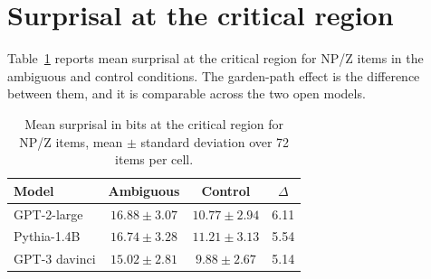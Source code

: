 \documentclass[11pt]{article}
\begin{document}
\section{Surprisal at the critical region}

Table~\ref{tab:calibration} reports mean surprisal at the critical region for
NP/Z items in the ambiguous and control conditions. The garden-path effect is
the difference between them, and it is comparable across the two open models.

\begin{table}[t]
\centering
\begin{tabular}{lccc}
\toprule
Model & Ambiguous & Control & $\Delta$ \\
\midrule
GPT-2-large   & $16.88 \pm 3.07$ & $10.77 \pm 2.94$ & 6.11 \\
Pythia-1.4B   & $16.74 \pm 3.28$ & $11.21 \pm 3.13$ & 5.54 \\
GPT-3 davinci & $15.02 \pm 2.81$ & $9.88 \pm 2.67$  & 5.14 \\
\bottomrule
\end{tabular}
\caption{Mean surprisal in bits at the critical region for NP/Z items,
mean $\pm$ standard deviation over 72 items per cell.}
\label{tab:calibration}
\end{table}
\end{document}
